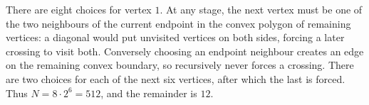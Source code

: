 There are eight choices for vertex $1$. At any stage, the next vertex must be one of the two neighbours of the current endpoint in the convex polygon of remaining vertices: a diagonal would put unvisited vertices on both sides, forcing a later crossing to visit both. Conversely choosing an endpoint neighbour creates an edge on the remaining convex boundary, so recursively never forces a crossing. There are two choices for each of the next six vertices, after which the last is forced. Thus $N=8\cdot2^6=512$, and the remainder is $\boxed{12}$.
